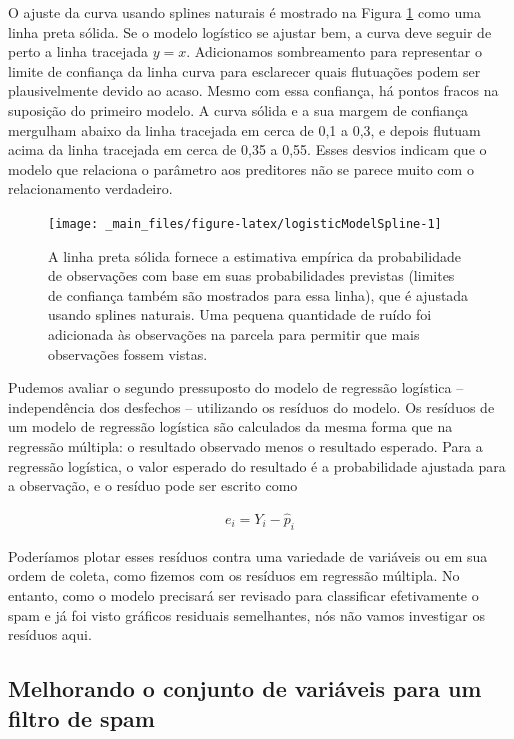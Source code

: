 \documentclass[
]{book}
\theoremstyle{definition}
\theoremstyle{definition}
\theoremstyle{definition}
\theoremstyle{definition}
\theoremstyle{remark}
\begin{document}
O ajuste da curva usando splines naturais é mostrado na Figura \ref{fig:logisticModelSpline} como uma linha preta sólida. Se o modelo logístico se ajustar bem, a curva deve seguir de perto a linha tracejada \(y=x\). Adicionamos sombreamento para representar o limite de confiança da linha curva para esclarecer quais flutuações podem ser plausivelmente devido ao acaso. Mesmo com essa confiança, há pontos fracos na suposição do primeiro modelo. A curva sólida e a sua margem de confiança mergulham abaixo da linha tracejada em cerca de 0,1 a 0,3, e depois flutuam acima da linha tracejada em cerca de 0,35 a 0,55. Esses desvios indicam que o modelo que relaciona o parâmetro aos preditores não se parece muito com o relacionamento verdadeiro.

\begin{figure}
\texttt{[image: \_main\_files/figure-latex/logisticModelSpline-1]} \caption{A linha preta sólida fornece a estimativa empírica da probabilidade de observações com base em suas probabilidades previstas (limites de confiança também são mostrados para essa linha), que é ajustada usando splines naturais. Uma pequena quantidade de ruído foi adicionada às observações na parcela para permitir que mais observações fossem vistas.}\label{fig:logisticModelSpline}
\end{figure}

Pudemos avaliar o segundo pressuposto do modelo de regressão logística -- independência dos desfechos -- utilizando os resíduos do modelo. Os resíduos de um modelo de regressão logística são calculados da mesma forma que na regressão múltipla: o resultado observado menos o resultado esperado. Para a regressão logística, o valor esperado do resultado é a probabilidade ajustada para a observação, e o resíduo pode ser escrito como

\begin{align*}
e_i = Y_i - \hat{p}_i
\end{align*}

Poderíamos plotar esses resíduos contra uma variedade de variáveis ou em sua ordem de coleta, como fizemos com os resíduos em regressão múltipla. No entanto, como o modelo precisará ser revisado para classificar efetivamente o spam e já foi visto gráficos residuais semelhantes, nós não vamos investigar os resíduos aqui.

\hypertarget{improvingTheSetOfVariablesForASpamFilter}{%
\subsection{Melhorando o conjunto de variáveis para um filtro de spam}\label{improvingTheSetOfVariablesForASpamFilter}}
\end{document}
